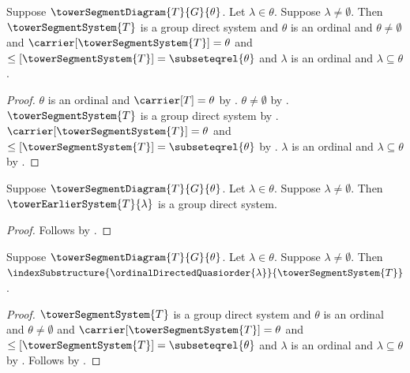 \begin{proposition}\label{tower_segment_restriction_context}
    Suppose $\towerSegmentDiagram{T}{G}{\theta}$.
    Let $\lambda\in\theta$.
    Suppose $\lambda\neq\emptyset$.
    Then $\towerSegmentSystem{T}$ is a group direct system and
        $\theta$ is an ordinal and $\theta\neq\emptyset$ and
        $\carrier[\towerSegmentSystem{T}]=\theta$ and
        $\leq[\towerSegmentSystem{T}]=\subseteqrel{\theta}$ and
        $\lambda$ is an ordinal and $\lambda\subseteq\theta$.
\end{proposition}
\begin{proof}
    $\theta$ is an ordinal and $\carrier[T]=\theta$ by
        .
    $\theta\neq\emptyset$ by .
    $\towerSegmentSystem{T}$ is a group direct system by
        .
    $\carrier[\towerSegmentSystem{T}]=\theta$ and
        $\leq[\towerSegmentSystem{T}]=\subseteqrel{\theta}$ by
        .
    $\lambda$ is an ordinal and $\lambda\subseteq\theta$ by
        .
\end{proof}

\begin{theorem}\label{tower_earlier_system_is_system}
    Suppose $\towerSegmentDiagram{T}{G}{\theta}$.
    Let $\lambda\in\theta$.
    Suppose $\lambda\neq\emptyset$.
    Then $\towerEarlierSystem{T}{\lambda}$ is a group direct system.
\end{theorem}
\begin{proof}
    Follows by
        .
\end{proof}

\begin{proposition}\label{tower_earlier_system_index_substructure}
    Suppose $\towerSegmentDiagram{T}{G}{\theta}$.
    Let $\lambda\in\theta$.
    Suppose $\lambda\neq\emptyset$.
    Then $\indexSubstructure
        {\ordinalDirectedQuasiorder{\lambda}}
        {\towerSegmentSystem{T}}$.
\end{proposition}
\begin{proof}
    $\towerSegmentSystem{T}$ is a group direct system and
        $\theta$ is an ordinal and $\theta\neq\emptyset$ and
        $\carrier[\towerSegmentSystem{T}]=\theta$ and
        $\leq[\towerSegmentSystem{T}]=\subseteqrel{\theta}$ and
        $\lambda$ is an ordinal and $\lambda\subseteq\theta$ by
        .
    Follows by .
\end{proof}

